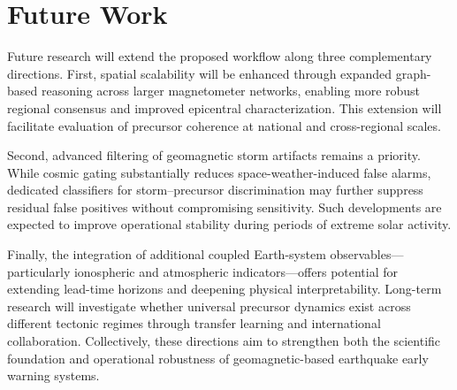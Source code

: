 \documentclass[a4paper,fleqn]{cas-sc}
\begin{document}
\section{Future Work}

Future research will extend the proposed workflow along three complementary directions. First, spatial scalability will be enhanced through expanded graph-based reasoning across larger magnetometer networks, enabling more robust regional consensus and improved epicentral characterization. This extension will facilitate evaluation of precursor coherence at national and cross-regional scales.

Second, advanced filtering of geomagnetic storm artifacts remains a priority. While cosmic gating substantially reduces space-weather-induced false alarms, dedicated classifiers for storm–precursor discrimination may further suppress residual false positives without compromising sensitivity. Such developments are expected to improve operational stability during periods of extreme solar activity.

Finally, the integration of additional coupled Earth-system observables—particularly ionospheric and atmospheric indicators—offers potential for extending lead-time horizons and deepening physical interpretability. Long-term research will investigate whether universal precursor dynamics exist across different tectonic regimes through transfer learning and international collaboration. Collectively, these directions aim to strengthen both the scientific foundation and operational robustness of geomagnetic-based earthquake early warning systems.


\printcredits
\clearpage


\end{document}
